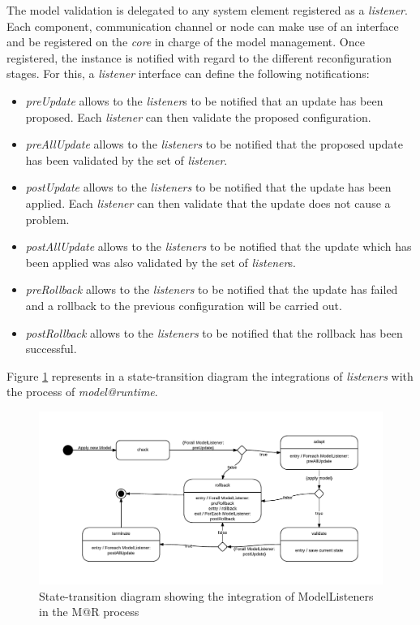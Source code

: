 The model validation is delegated to any system element registered as a \textit{listener}.
Each component, communication channel or node can make use of an interface and be registered on the \textit{core} in charge of the model management.
Once registered, the instance is notified with regard to the different reconfiguration stages.
For this, a \textit{listener} interface can define the following notifications:
\begin{itemize}
	\item \emph{preUpdate} allows to the \emph{listener}s to be notified that an update has been proposed.
	Each \emph{listener} can then validate the proposed configuration.
	\item \emph{preAllUpdate} allows to the \emph{listeners} to be notified that the proposed update has been validated by the set of \emph{listener}.
	\item \emph{postUpdate} allows to the \emph{listeners} to be notified that the update has been applied.
	Each \emph{listener} can then validate that the update does not cause a problem.
	\item \emph{postAllUpdate} allows to the \emph{listeners} to be notified that the update which has been applied was also validated by the set of \emph{listener}s.
	\item \emph{preRollback} allows to the \emph{listeners} to be notified that the update has failed and a rollback to the previous configuration will be carried out.
	\item \emph{postRollback} allows to the \emph{listeners} to be notified that the rollback has been successful.
\end{itemize}
Figure \ref{fig:MAR_modelListener} represents in a state-transition diagram the integrations of \textit{listeners} with the process of \textit{model@runtime}.

\begin{figure}[]
	\centering
	\includegraphics[width=1\columnwidth]{chapters/modelsAtRuntimeContiki.images/ModelListenerStateChart.pdf}
	\caption{State-transition diagram showing the integration of ModelListeners in the M@R process}
	\label{fig:MAR_modelListener}
\end{figure}

